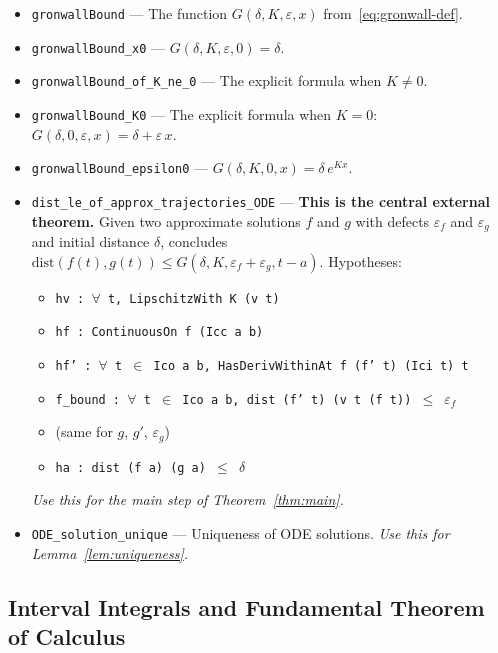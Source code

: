 \documentclass[11pt,a4paper]{article}
\theoremstyle{definition}
\newcommand{\dist}{\mathrm{dist}}
\begin{document}
\begin{itemize}
  \item \texttt{gronwallBound} --- The function
    $G(\delta, K, \varepsilon, x)$ from~\eqref{eq:gronwall-def}.

  \item \texttt{gronwallBound\_x0} ---
    $G(\delta, K, \varepsilon, 0) = \delta$.

  \item \texttt{gronwallBound\_of\_K\_ne\_0} ---
    The explicit formula when $K \neq 0$.

  \item \texttt{gronwallBound\_K0} ---
    The explicit formula when $K = 0$: $G(\delta, 0, \varepsilon, x) = \delta + \varepsilon\,x$.

  \item \texttt{gronwallBound\_epsilon0} ---
    $G(\delta, K, 0, x) = \delta\,e^{Kx}$.

  \item \texttt{dist\_le\_of\_approx\_trajectories\_ODE} ---
    \textbf{This is the central external theorem.}
    Given two approximate solutions $f$ and $g$ with defects
    $\varepsilon_f$ and $\varepsilon_g$ and initial distance $\delta$,
    concludes $\dist(f(t), g(t)) \le G(\delta, K,
    \varepsilon_f + \varepsilon_g, t - a)$.
    Hypotheses:
    \begin{itemize}
      \item \texttt{hv : $\forall$ t, LipschitzWith K (v t)}
      \item \texttt{hf : ContinuousOn f (Icc a b)}
      \item \texttt{hf' : $\forall$ t $\in$ Ico a b,
        HasDerivWithinAt f (f' t) (Ici t) t}
      \item \texttt{f\_bound : $\forall$ t $\in$ Ico a b,
        dist (f' t) (v t (f t)) $\le$ $\varepsilon_f$}
      \item (same for $g$, $g'$, $\varepsilon_g$)
      \item \texttt{ha : dist (f a) (g a) $\le$ $\delta$}
    \end{itemize}
    \emph{Use this for the main step of Theorem~\ref{thm:main}.}

  \item \texttt{ODE\_solution\_unique} ---
    Uniqueness of ODE solutions.
    \emph{Use this for Lemma~\ref{lem:uniqueness}.}
\end{itemize}


\subsection{Interval Integrals and Fundamental Theorem of Calculus}
\label{ssec:ftc}
\end{document}
